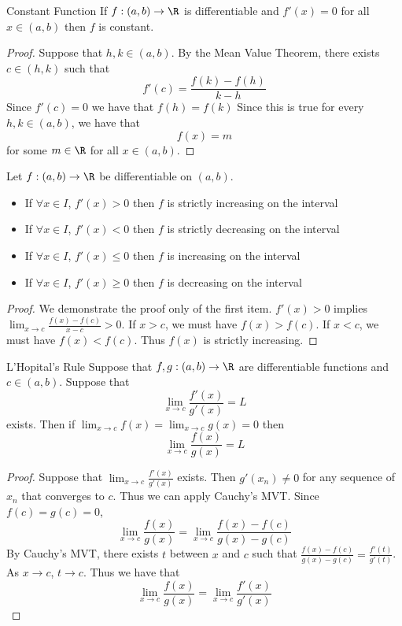 \begin{thm}{Constant Function}{} If $f:(a,b)\to\R$ is differentiable and $f'(x)=0$ for all $x\in(a,b)$ then $f$ is constant. \tcbline
\begin{proof} Suppose that $h,k\in(a,b)$. By the Mean Value Theorem, there exists $c\in(h,k)$ such that $$f'(c)=\frac{f(k)-f(h)}{k-h}$$ Since $f'(c)=0$ we have that $f(h)=f(k)$ Since this is true for every $h,k\in(a,b)$, we have that $$f(x)=m$$ for some $m\in\R$ for all $x\in(a,b)$. 
\end{proof}
\end{thm}


\begin{thm}{}{} Let $f:(a,b)\to\R$ be differentiable on $(a,b)$. 
\begin{itemize}
\item If $\forall x\in I$, $f'(x)>0$ then $f$ is strictly increasing on the interval
\item If $\forall x\in I$, $f'(x)<0$ then $f$ is strictly decreasing on the interval
\item If $\forall x\in I$, $f'(x)\leq 0$ then $f$ is increasing on the interval
\item If $\forall x\in I$, $f'(x)\geq 0$ then $f$ is decreasing on the interval
\end{itemize}\tcbline
\begin{proof} We demonstrate the proof only of the first item. $f'(x)>0$ implies $\lim_{x\to c}\frac{f(x)-f(c)}{x-c}>0$. If $x>c$, we must have $f(x)>f(c)$. If $x<c$, we must have $f(x)<f(c)$. Thus $f(x)$ is strictly increasing. 
\end{proof}
\end{thm}

\begin{thm}{L'Hopital's Rule}{} Suppose that $f,g:(a,b)\to\R$ are differentiable functions and $c\in(a,b)$. Suppose that $$\lim_{x\to c}\frac{f'(x)}{g'(x)}=L$$ exists. Then if $\lim_{x\to c}f(x)=\lim_{x\to c}g(x)=0$ then $$\lim_{x\to c}\frac{f(x)}{g(x)}=L$$ \tcbline
\begin{proof} Suppose that $\lim_{x\to c}\frac{f'(x)}{g'(x)}$ exists. Then $g'(x_n)\neq0$ for any sequence of $x_n$ that converges to $c$. Thus we can apply Cauchy's MVT. Since $f(c)=g(c)=0$, $$\lim_{x\to c}\frac{f(x)}{g(x)}=\lim_{x\to c}\frac{f(x)-f(c)}{g(x)-g(c)}$$ By Cauchy's MVT, there exists $t$ between $x$ and $c$ such that $\frac{f(x)-f(c)}{g(x)-g(c)}=\frac{f'(t)}{g'(t)}$. As $x\to c$, $t\to c$. Thus we have that $$\lim_{x\to c}\frac{f(x)}{g(x)}=\lim_{x\to c}\frac{f'(x)}{g'(x)}$$
\end{proof}
\end{thm}

